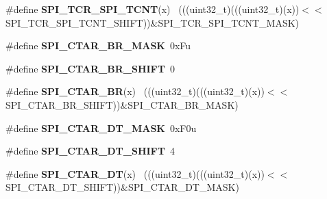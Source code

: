 \begin{DoxyCompactItemize}
\item 
\hypertarget{group___s_p_i___register___masks_ga83680010e4109df987bbfef6eb96460e}{}\#define {\bfseries S\+P\+I\+\_\+\+T\+C\+R\+\_\+\+S\+P\+I\+\_\+\+T\+C\+N\+T}(x)                                        ~(((uint32\+\_\+t)(((uint32\+\_\+t)(x))$<$$<$S\+P\+I\+\_\+\+T\+C\+R\+\_\+\+S\+P\+I\+\_\+\+T\+C\+N\+T\+\_\+\+S\+H\+I\+F\+T))\&S\+P\+I\+\_\+\+T\+C\+R\+\_\+\+S\+P\+I\+\_\+\+T\+C\+N\+T\+\_\+\+M\+A\+S\+K)\label{group___s_p_i___register___masks_ga83680010e4109df987bbfef6eb96460e}

\item 
\hypertarget{group___s_p_i___register___masks_gad1ba5817c825831950fc73cc726f0737}{}\#define {\bfseries S\+P\+I\+\_\+\+C\+T\+A\+R\+\_\+\+B\+R\+\_\+\+M\+A\+S\+K}~0x\+Fu\label{group___s_p_i___register___masks_gad1ba5817c825831950fc73cc726f0737}

\item 
\hypertarget{group___s_p_i___register___masks_gad988143e0be530acb59dca0fad52ec0b}{}\#define {\bfseries S\+P\+I\+\_\+\+C\+T\+A\+R\+\_\+\+B\+R\+\_\+\+S\+H\+I\+F\+T}~0\label{group___s_p_i___register___masks_gad988143e0be530acb59dca0fad52ec0b}

\item 
\hypertarget{group___s_p_i___register___masks_ga154db9f43556d80df49777de0644e296}{}\#define {\bfseries S\+P\+I\+\_\+\+C\+T\+A\+R\+\_\+\+B\+R}(x)                                                  ~(((uint32\+\_\+t)(((uint32\+\_\+t)(x))$<$$<$S\+P\+I\+\_\+\+C\+T\+A\+R\+\_\+\+B\+R\+\_\+\+S\+H\+I\+F\+T))\&S\+P\+I\+\_\+\+C\+T\+A\+R\+\_\+\+B\+R\+\_\+\+M\+A\+S\+K)\label{group___s_p_i___register___masks_ga154db9f43556d80df49777de0644e296}

\item 
\hypertarget{group___s_p_i___register___masks_ga7d4ee19c78f67b68c6320eefe6a53ac0}{}\#define {\bfseries S\+P\+I\+\_\+\+C\+T\+A\+R\+\_\+\+D\+T\+\_\+\+M\+A\+S\+K}~0x\+F0u\label{group___s_p_i___register___masks_ga7d4ee19c78f67b68c6320eefe6a53ac0}

\item 
\hypertarget{group___s_p_i___register___masks_gaac557ee81ac4ec00ee6280d5b761edf1}{}\#define {\bfseries S\+P\+I\+\_\+\+C\+T\+A\+R\+\_\+\+D\+T\+\_\+\+S\+H\+I\+F\+T}~4\label{group___s_p_i___register___masks_gaac557ee81ac4ec00ee6280d5b761edf1}

\item 
\hypertarget{group___s_p_i___register___masks_ga82a46889f3771fab6dca2dc28eac5100}{}\#define {\bfseries S\+P\+I\+\_\+\+C\+T\+A\+R\+\_\+\+D\+T}(x)                                                  ~(((uint32\+\_\+t)(((uint32\+\_\+t)(x))$<$$<$S\+P\+I\+\_\+\+C\+T\+A\+R\+\_\+\+D\+T\+\_\+\+S\+H\+I\+F\+T))\&S\+P\+I\+\_\+\+C\+T\+A\+R\+\_\+\+D\+T\+\_\+\+M\+A\+S\+K)\label{group___s_p_i___register___masks_ga82a46889f3771fab6dca2dc28eac5100}


\end{DoxyCompactItemize}
